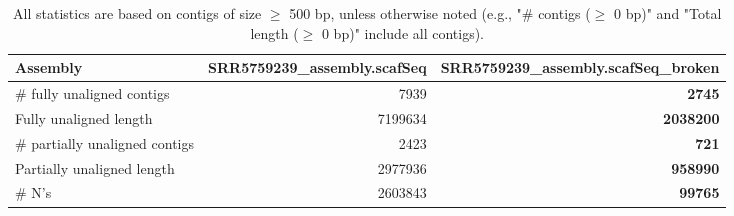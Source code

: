 \documentclass[12pt,a4paper]{article}
\begin{document}
\begin{table}[ht]
\begin{center}
\caption{All statistics are based on contigs of size $\geq$ 500 bp, unless otherwise noted (e.g., "\# contigs ($\geq$ 0 bp)" and "Total length ($\geq$ 0 bp)" include all contigs).}
\begin{tabular}{|l*{2}{|r}|}
\hline
Assembly & SRR5759239\_assembly.scafSeq & SRR5759239\_assembly.scafSeq\_broken \\ \hline
\# fully unaligned contigs & 7939 & {\bf 2745} \\ \hline
Fully unaligned length & 7199634 & {\bf 2038200} \\ \hline
\# partially unaligned contigs & 2423 & {\bf 721} \\ \hline
Partially unaligned length & 2977936 & {\bf 958990} \\ \hline
\# N's & 2603843 & {\bf 99765} \\ \hline
\end{tabular}
\end{center}
\end{table}
\end{document}
